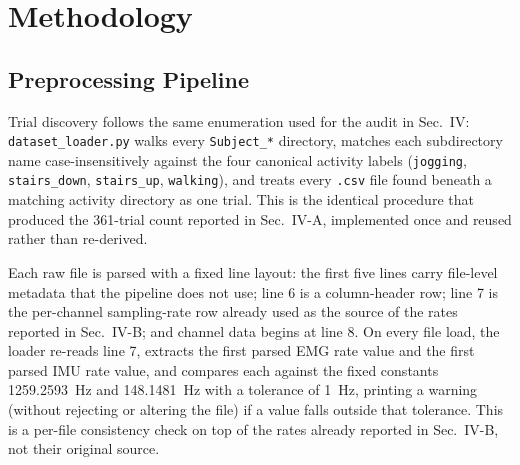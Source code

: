 \documentclass[conference]{IEEEtran}
\begin{document}
\section{Methodology}
\label{sec:methodology}

\subsection{Preprocessing Pipeline}
\label{subsec:preprocessing}

Trial discovery follows the same enumeration used for the audit in
Sec.~IV: \texttt{dataset\_loader.py} walks every \texttt{Subject\_*}
directory, matches each subdirectory name case-insensitively against
the four canonical activity labels (\texttt{jogging},
\texttt{stairs\_down}, \texttt{stairs\_up}, \texttt{walking}), and
treats every \texttt{.csv} file found beneath a matching activity
directory as one trial. This is the identical procedure that
produced the 361-trial count reported in Sec.~IV-A, implemented once
and reused rather than re-derived.

Each raw file is parsed with a fixed line layout: the first five
lines carry file-level metadata that the pipeline does not use; line
6 is a column-header row; line 7 is the per-channel sampling-rate
row already used as the source of the rates reported in Sec.~IV-B;
and channel data begins at line 8. On every file load, the loader
re-reads line 7, extracts the first parsed EMG rate value and the
first parsed IMU rate value, and compares each against the fixed
constants 1259.2593~Hz and 148.1481~Hz with a tolerance of 1~Hz,
printing a warning (without rejecting or altering the file) if a
value falls outside that tolerance. This is a per-file consistency
check on top of the rates already reported in Sec.~IV-B, not their
original source.
\end{document}
